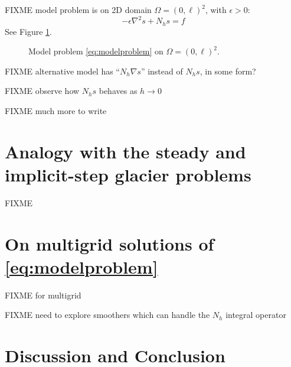 \documentclass[letterpaper,final,12pt,reqno]{amsart}
\theoremstyle{cstyle}
\theoremstyle{cstyle*}
\theoremstyle{dstyle}
\newcommand{\eps}{\epsilon}
\newcommand{\grad}{\nabla}
\begin{document}
FIXME model problem is on 2D domain $\Omega = (0,\ell)^2$, with $\eps>0$:
\begin{equation}
-\eps \grad^2 s + N_h s = f  \label{eq:modelproblem}
\end{equation}
See Figure \ref{fig:modelproblem}.

\begin{figure}
\caption{Model problem \eqref{eq:modelproblem} on $\Omega = (0,\ell)^2$.}
\label{fig:modelproblem}
\end{figure}

FIXME alternative model has ``$N_h \grad s$'' instead of $N_h s$, in some form?

FIXME observe how $N_h s$ behaves as $h\to 0$

FIXME much more to write


\section{Analogy with the steady and implicit-step glacier problems} \label{sec:analogy}

FIXME


\section{On multigrid solutions of \eqref{eq:modelproblem}} \label{sec:numerical}

FIXME \cite{Briggsetal2000,Bueler2021,Trottenbergetal2001} for multigrid

FIXME need to explore smoothers which can handle the $N_h$ integral operator

\section{Discussion and Conclusion} \label{sec:conclusion}
\end{document}
